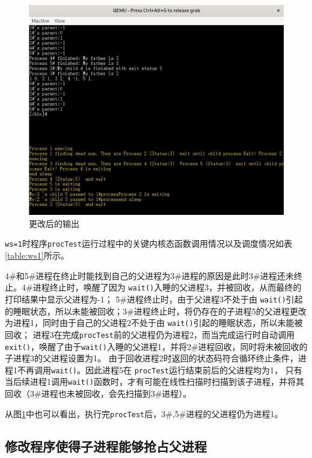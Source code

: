 \begin{figure}[!htbp]
    \centering
    \includegraphics[width=\textwidth]{images/after.png}
    \caption{更改后的输出}\label{fig:after}
\end{figure}

\texttt{ws=1}时程序\texttt{procTest}运行过程中的关键内核态函数调用情况以及调度情况如表\ref{table:ws1}所示。

4\#和5\#进程在终止时能找到自己的父进程为3\#进程的原因是此时3\#进程还未终止。4\#进程终止时，唤醒了因为 \texttt{wait()}入睡的父进程3，并被回收，从而最终的打印结果中显示父进程为-1；
5\#进程终止时，由于父进程3不处于由 \texttt{wait()}引起的睡眠状态，所以未能被回收；3\#进程终止时，将仍存在的子进程5的父进程更改为进程1，同时由于自己的父进程2不处于由 \texttt{wait()}引起的睡眠状态，所以未能被回收；
进程3在完成\texttt{procTest}前的父进程仍为进程2，而当完成运行时自动调用\texttt{exit()}，唤醒了由于\texttt{wait()}入睡的父进程1，并将2\#进程回收，同时将未被回收的子进程3的父进程设置为1。
由于回收进程2时返回的状态码符合循环终止条件，进程1不再调用\texttt{wait()}。因此进程5在 \texttt{procTest}运行结束前后的父进程均为1，
只有当后续进程1调用\texttt{wait()}函数时，才有可能在线性扫描时扫描到该子进程，并将其回收（3\#进程也未被回收，会先扫描到3\#进程）。

从图\ref{fig:after}中也可以看出，执行完\texttt{procTest}后，3\#,5\#进程的父进程仍为进程1。


\subsection{修改程序使得子进程能够抢占父进程}

